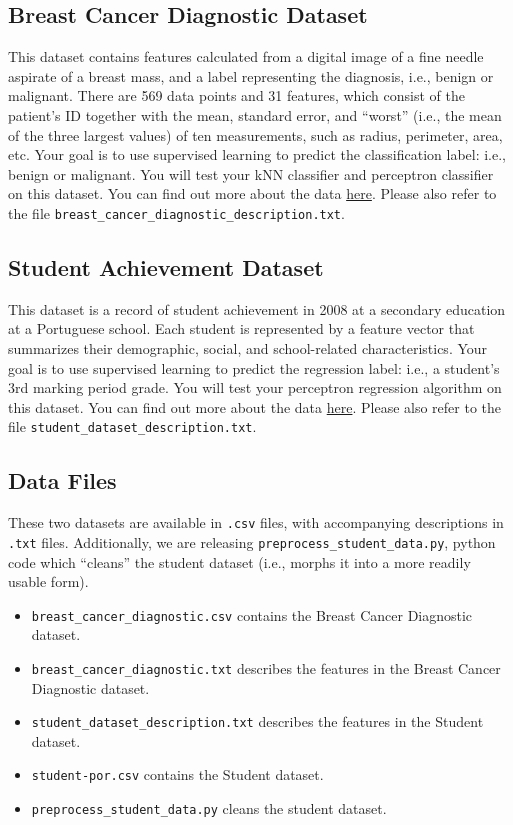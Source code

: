 \documentclass{article}
\begin{document}
\subsection{Breast Cancer Diagnostic Dataset}

This dataset contains features calculated from a digital image of a fine needle aspirate of a breast mass,
and a label representing the diagnosis, i.e., benign or malignant.
There are 569 data points and 31 features, which consist of the patient's ID
together with the mean, standard error, and  ``worst'' (i.e., the mean of the three largest values)
of ten measurements, such as radius, perimeter, area, etc.
%
Your goal is to use supervised learning to predict the classification label: i.e., benign or malignant. You will test your kNN classifier and perceptron classifier on this dataset.
You can find out more about the data
\href{http://archive.ics.uci.edu/ml/datasets/Breast+Cancer+Wisconsin+(Diagnostic)}{here}.
Please also refer to the file
\verb|breast_cancer_diagnostic_description.txt|.

\subsection{Student Achievement Dataset}

This dataset is a record of student achievement in 2008 at a secondary education at a Portuguese school.
Each student is represented by a feature vector that summarizes their demographic, social, and school-related characteristics.
%
Your goal is to use supervised learning to predict the regression label: i.e., a student's 3rd marking period grade. You will test your perceptron regression algorithm on this dataset.
You can find out more about the data
\href{http://archive.ics.uci.edu/ml/datasets/Student+Performance}{here}.
Please also refer to the file \verb|student_dataset_description.txt|.

\subsection{Data Files}

These two datasets are available in \texttt{.csv} files, with accompanying descriptions in \texttt{.txt} files.
Additionally, we are releasing \verb|preprocess_student_data.py|, python code which ``cleans'' the student dataset
(i.e., morphs it into a more readily usable form).

\begin{itemize}
\item \verb|breast_cancer_diagnostic.csv| contains the Breast Cancer Diagnostic dataset.
\item \verb|breast_cancer_diagnostic.txt| describes the features in the Breast Cancer Diagnostic dataset.

\item \verb|student_dataset_description.txt| describes the features in the Student dataset.
\item \verb|student-por.csv| contains the Student dataset.
\item \verb|preprocess_student_data.py| cleans the student dataset.
\end{itemize}
\fi
\end{document}
